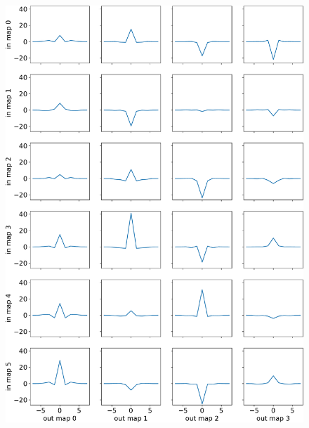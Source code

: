 \documentclass[final,twocolumn,3p,times,sort&compress]{elsarticle}
\newcommand{\1}{\b{1}}              %
\newcommand{\0}{\b{0}}              %
\begin{document}
\begin{figure}
	\centering
	\includegraphics[width=\linewidth]{section_filter_last}
	\\

\end{figure}
\end{document}
